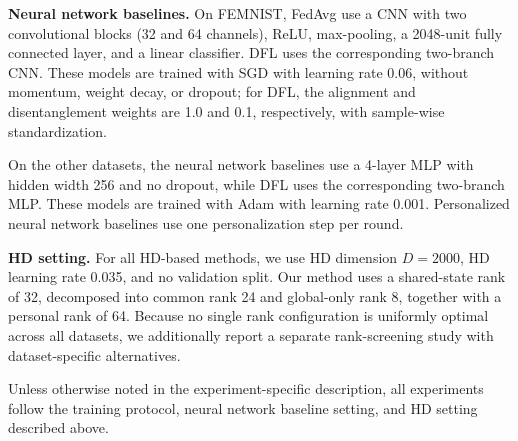 \documentclass[lettersize,journal]{IEEEtran}
\newcommand{\rev}[1]{#1}
\begin{document}
\noindent\textbf{Neural network baselines.}
On FEMNIST, FedAvg use a CNN with two convolutional blocks (32 and 64 channels), ReLU, max-pooling, a 2048-unit fully connected layer, and a linear classifier.
DFL uses the corresponding two-branch CNN.
These models are trained with SGD with learning rate 0.06, without momentum, weight decay, or dropout; for DFL, the alignment and disentanglement weights are 1.0 and 0.1, respectively, with sample-wise standardization.

On the other datasets, the neural network baselines use a 4-layer MLP with hidden width 256 and no dropout, while DFL uses the corresponding two-branch MLP.
These models are trained with Adam with learning rate 0.001.
Personalized neural network baselines use one personalization step per round.

\noindent\textbf{HD setting.}
For all HD-based methods, we use HD dimension \(D=2000\), HD learning rate 0.035, and no validation split.
Our method uses a \rev{shared-state rank} of 32, decomposed into common rank 24 and global-only rank 8, together with a personal rank of 64.
Because no single rank configuration is uniformly optimal across all datasets, we additionally report a separate rank-screening study with dataset-specific alternatives.

Unless otherwise noted in the experiment-specific description, all experiments follow the training protocol, neural network baseline setting, and HD setting described above.







\end{document}

